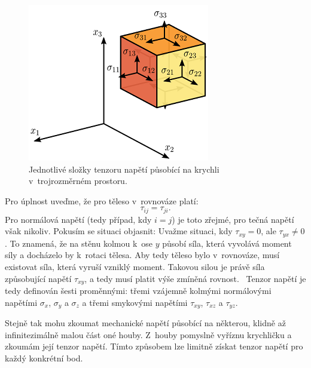 \documentclass[12pt]{article}
\begin{document}
\begin{figure}
    \centering
    \includegraphics[width = 0.5\linewidth]{figures/Stress_vectors.png}
    \caption{Jednotlivé složky tenzoru napětí působící na krychli v~trojrozměrném prostoru.~\cite{Figure:stress_tensor}}
    \label{fig:tensor_napeti}
\end{figure}

\par \noindent
Pro úplnost uveďme, že pro těleso v~rovnováze platí:
\begin{equation}
    \tau_{ij} = \tau_{ji}.
    \label{eq:symmetry}
\end{equation}
Pro normálová napětí (tedy případ, kdy $i = j$) je toto zřejmé, pro tečná napětí však nikoliv. Pokusím se situaci objasnit: Uvažme situaci, kdy $\tau_{xy} = 0$, ale $\tau_{yx} \neq 0$. To znamená, že na stěnu kolmou k~ose $y$ působí síla, která vyvolává moment síly a docházelo by k~rotaci tělesa. Aby tedy těleso bylo v~rovnováze, musí existovat síla, která vyruší vzniklý moment. Takovou silou je právě síla způsobující napětí $\tau_{xy}$, a tedy musí platit výše zmíněná rovnost.\footnotemark~\cite{online:Skripta_napětí} Tenzor napětí je tedy definován šesti proměnnými: třemi vzájemně kolmými normálovými napětími $\sigma_x$, $\sigma_y$ a $\sigma_z$ a třemi smykovými napětími $\tau_{xy}$, $\tau_{xz}$ a $\tau_{yz}$. \cite{wiki:Stress_mechanics}
\par\noindent
Stejně tak mohu zkoumat mechanické napětí působící na některou, klidně až infinitezimálně malou část oné houby. Z~houby pomyslně vyříznu krychličku a zkoumám její tenzor napětí. Tímto způsobem lze limitně získat tenzor napětí pro každý konkrétní bod.~\cite{material:Mechanika_kontinua}~\cite{wiki:Cauchy_stress_tensor}
\end{document}
